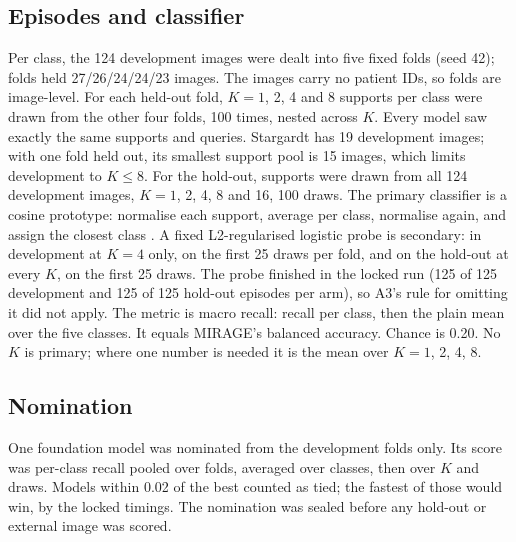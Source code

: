 \documentclass[conference]{IEEEtran}
\begin{document}
\subsection{Episodes and classifier}
Per class, the 124 development images were dealt into five fixed folds (seed 42); folds held 27/26/24/24/23 images. The images carry no patient IDs, so folds are image-level. For each held-out fold, $K=1$, 2, 4 and 8 supports per class were drawn from the other four folds, 100 times, nested across $K$. Every model saw exactly the same supports and queries. Stargardt has 19 development images; with one fold held out, its smallest support pool is 15 images, which limits development to $K\le8$. For the hold-out, supports were drawn from all 124 development images, $K=1$, 2, 4, 8 and 16, 100 draws.
The primary classifier is a cosine prototype: normalise each support, average per class, normalise again, and assign the closest class \cite{SimpleShot2019}. A fixed L2-regularised logistic probe is secondary: in development at $K=4$ only, on the first 25 draws per fold, and on the hold-out at every $K$, on the first 25 draws. The probe finished in the locked run (125 of 125 development and 125 of 125 hold-out episodes per arm), so A3's rule for omitting it did not apply.
The metric is macro recall: recall per class, then the plain mean over the five classes. It equals MIRAGE's balanced accuracy. Chance is 0.20. No $K$ is primary; where one number is needed it is the mean over $K=1$, 2, 4, 8.

\subsection{Nomination}
One foundation model was nominated from the development folds only. Its score was per-class recall pooled over folds, averaged over classes, then over $K$ and draws. Models within 0.02 of the best counted as tied; the fastest of those would win, by the locked timings. The nomination was sealed before any hold-out or external image was scored.
\end{document}
